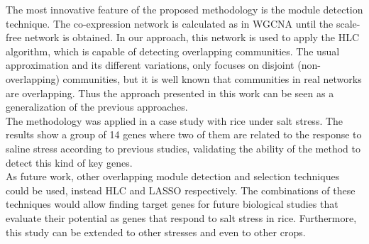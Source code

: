 \documentclass[12pt,journal, onecolumn]{IEEEtran}
\begin{document}
The most innovative feature of the proposed methodology is the module detection technique. 
The co-expression network is calculated as in WGCNA until the scale-free network is obtained. In our approach, this network is used to apply the HLC algorithm, which is capable of detecting overlapping communities. The usual approximation and its different variations, only focuses on disjoint (non-overlapping) communities, but it is well known that communities in real networks are overlapping. Thus the approach presented in this work can be seen as a generalization of the previous approaches.\\



The methodology was applied in a case study with rice under salt stress. The results show a group of 14 genes where two of them are related to the response to saline stress according to previous studies, validating the ability of the method to detect this kind of key genes.\\

As future work, other overlapping module detection and selection techniques could be used, instead HLC and LASSO respectively. The combinations of these techniques would allow finding target genes for future biological studies that evaluate their potential as genes that respond to salt stress in rice. Furthermore, this study can be extended to other stresses and even to other crops.\\




\end{document}
